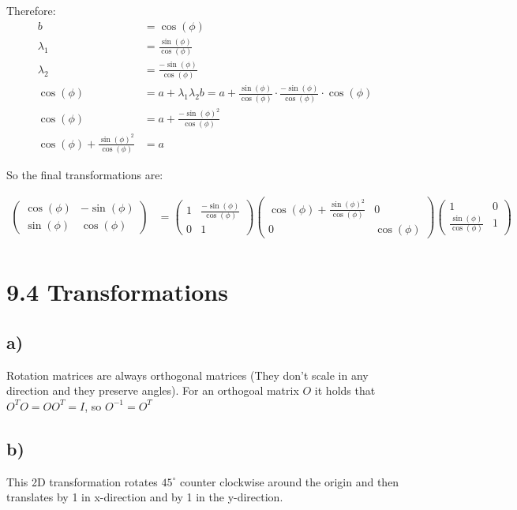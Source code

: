 \documentclass[a4paper]{scrartcl}
\begin{document}
Therefore:
\begin{align*}
  b &= \cos(\phi) \\
  \lambda_1 &= \frac{\sin(\phi)}{\cos(\phi)} \\
  \lambda_2 &= \frac{-\sin(\phi)}{\cos(\phi)} \\
  \cos(\phi) &= a + \lambda_1 \lambda_2 b = a + \frac{\sin(\phi)}{\cos(\phi)} \cdot \frac{-\sin(\phi)}{\cos(\phi)} \cdot \cos(\phi) \\
  \cos(\phi) &= a + \frac{- \sin(\phi)^2}{\cos(\phi)} \\
  \cos(\phi) + \frac{\sin(\phi)^2}{\cos(\phi)} &= a
\end{align*}

So the final transformations are:

\begin{align*}
  \begin{pmatrix} \cos(\phi) & - \sin(\phi) \\ \sin(\phi) & \cos(\phi) \end{pmatrix} &=
  \begin{pmatrix} 1 & \frac{-\sin(\phi)}{\cos(\phi)} \\ 0 & 1 \end{pmatrix}
  \begin{pmatrix} \cos(\phi) + \frac{\sin(\phi)^2}{\cos(\phi)} & 0 \\ 0 & \cos(\phi) \end{pmatrix} 
  \begin{pmatrix} 1 & 0 \\ \frac{\sin(\phi)}{\cos(\phi)} & 1 \end{pmatrix} \\
\end{align*}


\section*{9.4 Transformations}
\subsection*{a)}
Rotation matrices are always orthogonal matrices (They don't scale in any direction and they preserve angles). For an orthogoal matrix $O$ it holds that
$O^T O = O O^T = I$, so $O^{-1} = O^T$

\subsection*{b)}
This 2D transformation rotates $45^\circ$ counter clockwise around the origin and then translates by 1 in x-direction and by 1 in the y-direction.
\end{document}
